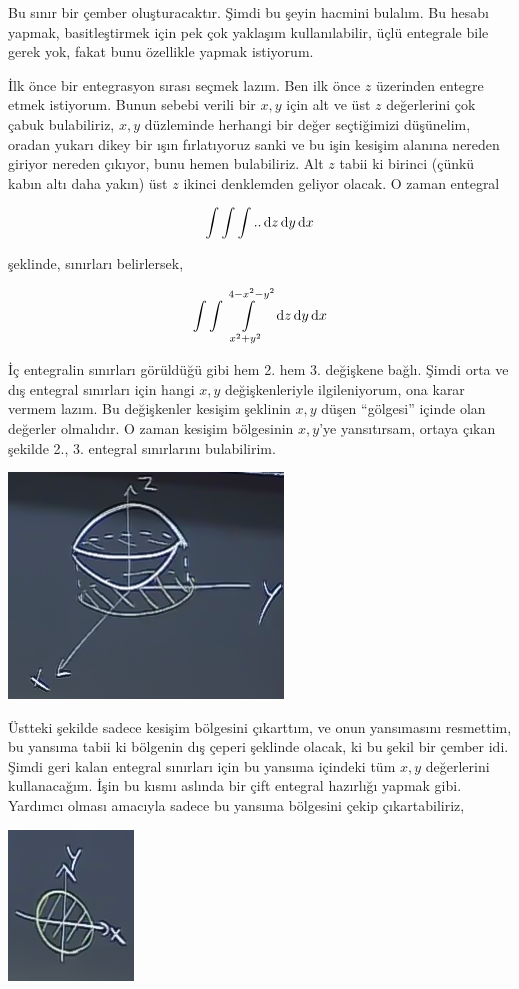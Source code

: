 \documentclass[12pt,fleqn]{article}\usepackage{../../common}
\begin{document}
Bu sınır bir çember oluşturacaktır. Şimdi bu şeyin hacmini bulalım. Bu
hesabı yapmak, basitleştirmek için pek çok yaklaşım kullanılabilir, üçlü
entegrale bile gerek yok, fakat bunu özellikle yapmak istiyorum. 

İlk önce bir entegrasyon sırası seçmek lazım. Ben ilk önce $z$ üzerinden
entegre etmek istiyorum. Bunun sebebi verili bir $x,y$ için alt ve üst $z$
değerlerini çok çabuk bulabiliriz, $x,y$ düzleminde herhangi bir değer
seçtiğimizi düşünelim, oradan yukarı dikey bir ışın fırlatıyoruz sanki ve
bu işin kesişim alanına nereden giriyor nereden çıkıyor, bunu hemen
bulabiliriz. Alt $z$ tabii ki birinci (çünkü kabın altı daha yakın) üst $z$
ikinci denklemden geliyor olacak. O zaman entegral

$$ 
\int \int \int .. \,\mathrm{d} z \,\mathrm{d} y \,\mathrm{d} x
$$

şeklinde, sınırları belirlersek,

$$ 
\int \int \int\limits_{x^2+y^2}^{4-x^2-y^2}  \,\mathrm{d} z \,\mathrm{d} y \,\mathrm{d} x
$$

İç entegralin sınırları görüldüğü gibi hem 2. hem 3. değişkene bağlı. Şimdi
orta ve dış entegral sınırları için hangi $x,y$ değişkenleriyle
ilgileniyorum, ona karar vermem lazım. Bu değişkenler kesişim şeklinin
$x,y$ düşen ``gölgesi'' içinde olan değerler olmalıdır. O zaman kesişim
bölgesinin $x,y$'ye yansıtırsam, ortaya çıkan şekilde 2., 3. entegral
sınırlarını bulabilirim. 

\includegraphics[height=6cm]{25_5.png}

Üstteki şekilde sadece kesişim bölgesini çıkarttım, ve onun yansımasını
resmettim, bu yansıma tabii ki bölgenin dış çeperi şeklinde olacak, ki bu
şekil bir çember idi. Şimdi geri kalan entegral sınırları için bu yansıma
içindeki tüm $x,y$ değerlerini kullanacağım. İşin bu kısmı aslında bir çift
entegral hazırlığı yapmak gibi. Yardımcı olması amacıyla sadece bu yansıma
bölgesini çekip çıkartabiliriz,

\includegraphics[height=4cm]{25_6.png}
\end{document}
